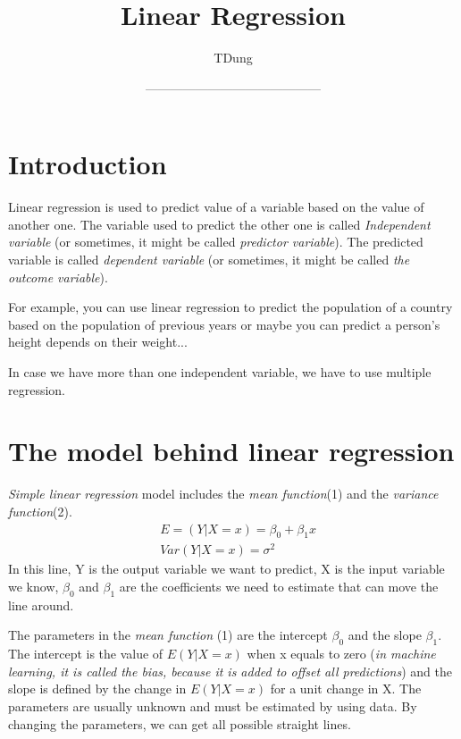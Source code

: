 \documentclass{article}
\title{Linear Regression}
\author{TDung}
\date{------------------------------------------}
\begin{document}
\tableofcontents

\maketitle
\section{Introduction}
  
	Linear regression is used to predict value of a variable based on the value of another one. The variable used to predict the other one is called \textit{Independent variable} (or sometimes, it might be called \textit{predictor variable}). The predicted variable is called \textit{dependent variable} (or sometimes, it might be called \textit{the outcome variable}).
	
    For example, you can use linear regression to predict the population of a country based on the population of previous years or maybe you can predict a person's height depends on their weight...
    
    In case we have more than one independent variable, we have to use multiple regression.
    
\section{The model behind linear regression} 
	\textit{Simple linear regression} model includes the \textit{mean function}(1) and the \textit{variance function}(2). 
	\begin{align}
            &E = (Y|X=x) = \beta _{0} + \beta _{1} x \\
            &Var(Y|X=x) = \sigma ^ {2}
    \end{align}
    In this line, Y is the output variable we want to predict, X is the input variable we know, $\beta_{0}$ and $\beta_{1}$ are the coefficients we need to estimate that can move the line around.
    
    The parameters in the \textit{mean function} (1) are the intercept ${\beta _{0}}$ and the slope ${\beta_{1}}$. The intercept is the value of ${E(Y |X = x)}$ when x equals to zero (\textit{in machine learning, it is called the bias, because it is added to offset all predictions}) and the slope is defined by the change in ${E(Y |X = x)}$ for a unit change in X. The parameters are usually unknown and must be estimated by using data. By changing the parameters, we can get all possible straight lines.
    
\end{document}
